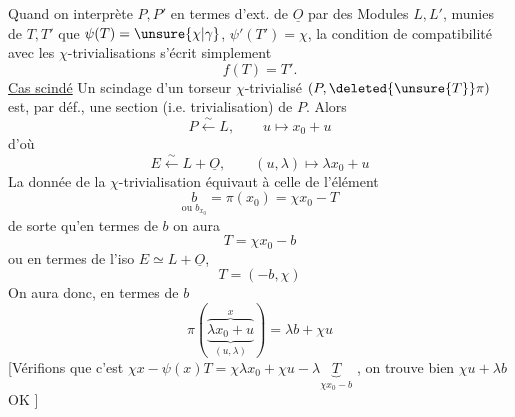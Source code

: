 Quand on interprète $P,P'$ en termes d'ext. de $\underline O$ par des Modules $L,L'$, munies de $T,T'$  que $\psi(T)=\unsure{\chi|\gamma}$, $\psi'(T')=\chi$, la condition de compatibilité avec les $\chi$-trivialisations s'écrit simplement
\[
f(T)=T'.
\]
\uline{Cas scindé} Un scindage d'un torseur $\chi$-trivialisé $(P,\deleted{\unsure{T}}\pi)$ est, par déf., une section (i.e. trivialisation)  de $P$. Alors 
\[
P\xleftarrow{\sim} L,\qquad u\longmapsto x_0+u
\]
 d'où
\[
E\xleftarrow{\sim}L+\underline O,\qquad(u,\lambda)\longmapsto\lambda x_0+u
\]
La donnée de la $\chi$-trivialisation équivaut à celle de l'élément
\[
\underset{\text{ou }b_{x_0}}{b}=\pi(x_0)=\chi x_0-T
\]
de  sorte qu'en termes de $b$ on aura
\[
T=\chi x_0-b
\]
ou en termes de l'iso $E\simeq L+\underline O$,
\[
T=(-b,\chi)
\]
On aura donc, en termes de $b$
\[
\pi(\overbrace{\underbrace{\lambda x_0+u}_{(u,\lambda)}}^{x})=\lambda b+\chi u
\]
[Vérifions que c'est  \deleted{$\unsure{\pi}$} $\chi x-\psi(x)T=\chi\lambda x_0+\chi u-\lambda\underbrace{T}_{\chi x_0-b}$ \deleted{\unsure{$=$}}, on trouve bien $\chi u+\lambda b$ OK ]

